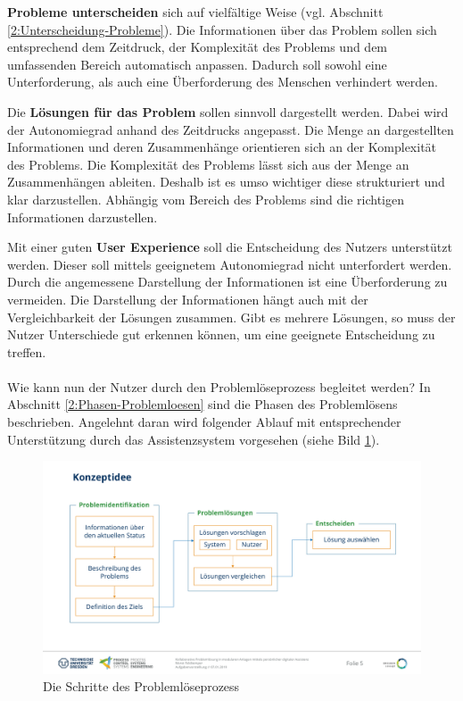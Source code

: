 \textbf{Probleme unterscheiden} sich auf vielfältige Weise (vgl. Abschnitt \ref{2:Unterscheidung-Probleme}). Die Informationen über das Problem sollen sich entsprechend dem Zeitdruck, der Komplexität des Problems und dem umfassenden Bereich automatisch anpassen. Dadurch soll sowohl eine Unterforderung, als auch eine Überforderung des Menschen verhindert werden.

Die \textbf{Lösungen für das Problem} sollen sinnvoll dargestellt werden. Dabei wird der Autonomiegrad anhand des Zeitdrucks angepasst. Die Menge an dargestellten Informationen und deren Zusammenhänge orientieren sich an der Komplexität des Problems. Die Komplexität des Problems lässt sich aus der Menge an Zusammenhängen ableiten. Deshalb ist es umso wichtiger diese strukturiert und klar darzustellen. Abhängig vom Bereich des Problems sind die richtigen Informationen darzustellen.

Mit einer guten \textbf{User Experience} soll die Entscheidung des Nutzers unterstützt werden. Dieser soll mittels geeignetem Autonomiegrad nicht unterfordert werden. Durch die angemessene Darstellung der Informationen ist eine Überforderung zu vermeiden. Die Darstellung der Informationen hängt auch mit der Vergleichbarkeit der Lösungen zusammen. Gibt es mehrere Lösungen, so muss der Nutzer Unterschiede gut erkennen können, um eine geeignete Entscheidung zu treffen.
\\ \\
Wie kann nun der Nutzer durch den Problemlöseprozess begleitet werden? In Abschnitt \ref{2:Phasen-Problemloesen} sind die Phasen des Problemlösens beschrieben. Angelehnt daran wird folgender Ablauf mit entsprechender Unterstützung durch das Assistenzsystem vorgesehen (siehe Bild \ref{pic:Konzeptidee}).
\begin{figure}[htbp]
\centering
\includegraphics[scale=0.45]{DA_files/Bilder/Konzept/Konzeptidee.pdf}
\caption{Die Schritte des Problemlöseprozess}
\label{pic:Konzeptidee}
\end{figure}

